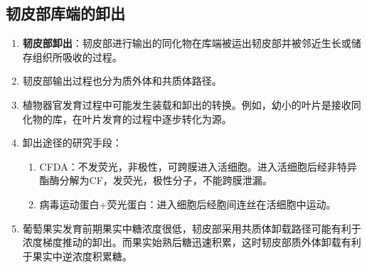\subsection{韧皮部库端的卸出}
\begin{enumerate}
    \item \textbf{韧皮部卸出}：韧皮部进行输出的同化物在库端被运出韧皮部并被邻近生长或储存组织所吸收的过程。
    \item 韧皮部输出过程也分为质外体和共质体路径。
    \item 植物器官发育过程中可能发生装载和卸出的转换。例如，幼小的叶片是接收同化物的库，在叶片发育的过程中逐步转化为源。
    \item 卸出途径的研究手段：
    \begin{enumerate}
        \item CFDA：不发荧光，非极性，可跨膜进入活细胞。进入活细胞后经非特异酯酶分解为CF，发荧光，极性分子，不能跨膜泄漏。
        \item 病毒运动蛋白+荧光蛋白：进入细胞后经胞间连丝在活细胞中运动。
    \end{enumerate}
    \item 葡萄果实发育前期果实中糖浓度很低，韧皮部采用共质体卸载路径可能有利于浓度梯度推动的卸出。而果实始熟后糖迅速积累，这时韧皮部质外体卸载有利于果实中逆浓度积累糖。
\end{enumerate}

